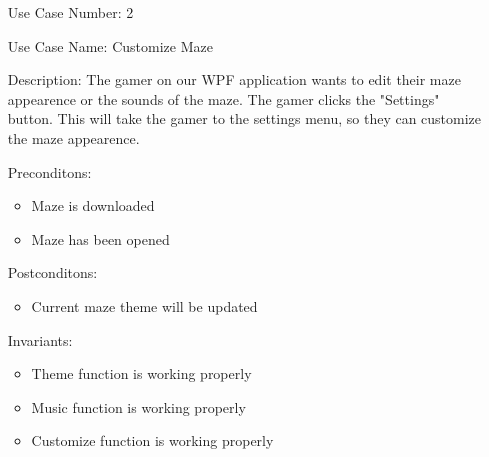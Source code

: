 \documentclass[10pt,conference,onecolumn,compsoc]{IEEEtran}
\begin{document}
\begin{itemize}
\item[Use Case Number:] 2
\item[Use Case Name:] Customize Maze
\item[Description:] The gamer on our WPF application wants to edit their maze appearence or the sounds of the maze. The gamer clicks the "Settings" button. This will take the gamer to the settings menu, so they can customize the maze appearence.

\item[Preconditons:]
\begin{itemize} 
\item Maze is downloaded
\item Maze has been opened
\end{itemize}

\item[Postconditons:]
\begin{itemize} 
\item Current maze theme will be updated
\end{itemize}
\item[Invariants:]
\begin{itemize} 
\item Theme function is working properly
\item Music function is working properly
\item Customize function is working properly

\end{itemize}
\end{itemize}
\end{document}
